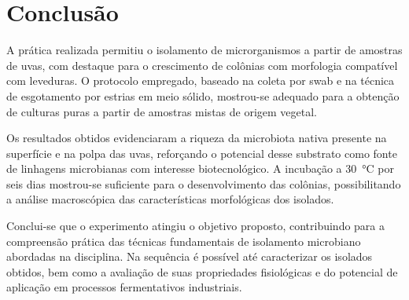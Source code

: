
\section{Conclusão}

A prática realizada permitiu o isolamento de microrganismos a partir de amostras de uvas, com destaque para o crescimento de colônias com morfologia compatível com leveduras. O protocolo empregado, baseado na coleta por swab e na técnica de esgotamento por estrias em meio sólido, mostrou-se adequado para a obtenção de culturas puras a partir de amostras mistas de origem vegetal.

Os resultados obtidos evidenciaram a riqueza da microbiota nativa presente na superfície e na polpa das uvas, reforçando o potencial desse substrato como fonte de linhagens microbianas com interesse biotecnológico. A incubação a 30~°C por seis dias mostrou-se suficiente para o desenvolvimento das colônias, possibilitando a análise macroscópica das características morfológicas dos isolados.

Conclui-se que o experimento atingiu o objetivo proposto, contribuindo para a compreensão prática das técnicas fundamentais de isolamento microbiano abordadas na disciplina. Na sequência é possível até caracterizar os isolados obtidos, bem como a avaliação de suas propriedades fisiológicas e do potencial de aplicação em processos fermentativos industriais.
